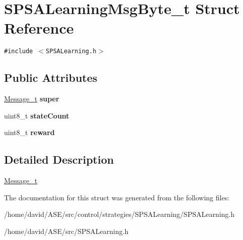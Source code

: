 \hypertarget{structSPSALearningMsgByte__t}{
\section{SPSALearningMsgByte\_\-t Struct Reference}
\label{structSPSALearningMsgByte__t}
}
{\tt \#include $<$SPSALearning.h$>$}

\subsection*{Public Attributes}
\begin{CompactItemize}
\item 
\hypertarget{structSPSALearningMsgByte__t_03628086a6d91f6485d96c47f2313cd7}{
\hyperlink{structMessage__t}{Message\_\-t} \textbf{super}}
\label{structSPSALearningMsgByte__t_03628086a6d91f6485d96c47f2313cd7}

\item 
\hypertarget{structSPSALearningMsgByte__t_dd5be01bb0bee822602e50f92a68a959}{
uint8\_\-t \textbf{stateCount}}
\label{structSPSALearningMsgByte__t_dd5be01bb0bee822602e50f92a68a959}

\item 
\hypertarget{structSPSALearningMsgByte__t_5c39746211a517834e8da96053df91d5}{
uint8\_\-t \textbf{reward}}
\label{structSPSALearningMsgByte__t_5c39746211a517834e8da96053df91d5}

\end{CompactItemize}


\subsection{Detailed Description}
\hyperlink{structMessage__t}{Message\_\-t} 

The documentation for this struct was generated from the following files:\begin{CompactItemize}
\item 
/home/david/ASE/src/control/strategies/SPSALearning/SPSALearning.h\item 
/home/david/ASE/src/SPSALearning.h\end{CompactItemize}
